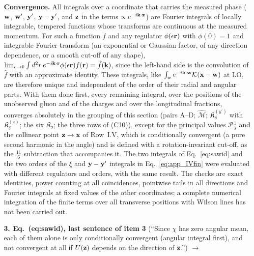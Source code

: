 {{{\textbf{Convergence.} All integrals over a coordinate that carries the measured phase ($\mathbf{w}$, $\mathbf{w}'$, $\mathbf{y}'$, $\mathbf{y}-\mathbf{y}'$, and $\mathbf{z}$ in the terms $\propto e^{-i\mathbf{k}\cdot\mathbf{z}}$) are Fourier integrals of locally integrable, tempered functions whose transforms are continuous at the measured momentum. For such a function $f$ and any regulator $\phi(\epsilon\mathbf{r})$ with $\phi(0)=1$ and integrable Fourier transform (an exponential or Gaussian factor, of any direction dependence, or a smooth cut-off of any shape), $\lim_{\epsilon\to0}\int d^2r\,e^{-i\mathbf{k}\cdot\mathbf{r}}\phi(\epsilon\mathbf{r})f(\mathbf{r})=\hat f(\mathbf{k})$, since the left-hand side is the convolution of $\hat f$ with an approximate identity. These integrals, like $\int_we^{-i\mathbf{k}\cdot\mathbf{w}}\mathcal K(\mathbf{x}-\mathbf{w})$ at LO, are therefore unique and independent of the order of their radial and angular parts. With them done first, every remaining integral, over the positions of the unobserved gluon and of the charges and over the longitudinal fractions, converges absolutely in the grouping of this section (pairs A--D; $\widehat{\mathcal M}$; $\mathfrak K^{(y')}_\delta$ with $\mathfrak K^{(z)}_\delta$; the six $\mathfrak K_2$; the three rows of (C10)), except for the principal values $\mathcal P\frac1s$ and the collinear point $\mathbf{z}\to\mathbf{x}$ of Row~I.V, which is conditionally convergent (a pure second harmonic in the angle) and is defined with a rotation-invariant cut-off, as the $\frac{11}{6}$ subtraction that accompanies it. The two integrals of Eq.~\eqref{eq:sawid} and the two orders of the $\xi$ and $\mathbf{y}-\mathbf{y}'$ integrals in Eq.~\eqref{eq:app_IVfin} were evaluated with different regulators and orders, with the same result. The checks are exact identities, power counting at all coincidences, pointwise tails in all directions and Fourier integrals at fixed values of the other coordinates; a complete numerical integration of the finite terms over all transverse positions with Wilson lines has not been carried out.}}\par\medskip

\noindent\textbf{3. Eq.~(eq:sawid), last sentence of item 3} (``Since $\chi$ has zero angular mean, each of them alone is only conditionally convergent (angular integral first), and not convergent at all if $U(\mathbf{z})$ depends on the direction of $\mathbf{z}$.'') $\to$\par\smallskip
\noindent{}\par\medskip

}
